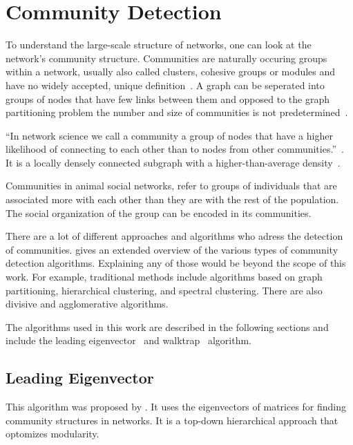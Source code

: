 \section{Community Detection}
To understand the large-scale structure of networks, one can look at the network's community structure. Communities are naturally occuring groups within a network, usually also called clusters, cohesive groups or modules and have no widely accepted, unique definition~\cite{palla2005uncovering}.
A graph can be seperated into groups of nodes that have few links between them and opposed to the graph partitioning problem the number and size of communities is not predetermined~\cite[p.~371]{newman2010networks}.

``In network science we call a community a group of nodes that have a higher likelihood of connecting to each other than to nodes from other communities.''~\cite[p.~X]{barabasi2016network}. It is a locally densely connected subgraph with a higher-than-average density~\cite[p.~X]{barabasi2016network}.

Communities in animal social networks, refer to groups of individuals that are associated more with each other than they are with the rest of the population. The social organization of the group can be encoded in its communities.~\cite{croft2008exploring}

There are a lot of different approaches and algorithms who adress the detection of communities. \textcite{fortunato2010community} gives an extended overview of the various types of community detection algorithms.
Explaining any of those would be beyond the scope of this work. For example, traditional methods include algorithms based on graph partitioning, hierarchical clustering, and spectral clustering. There are also divisive and agglomerative algorithms.

The algorithms used in this work are described in the following sections and include the leading eigenvector~\cite{newman2006finding} and walktrap~\cite{pons2005computing} algorithm. 

\subsection{Leading Eigenvector}
This algorithm was proposed by \textcite{newman2006finding}. It uses the eigenvectors of matrices for finding community structures in networks. It is a top-down hierarchical approach that optomizes modularity.

